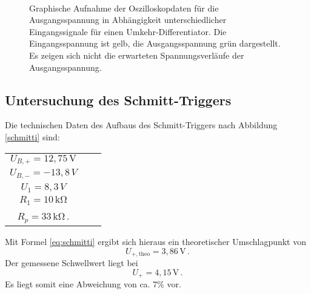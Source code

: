 \begin{figure}[!ht]
   \centering
   \quad
   \\
   \caption{Graphische Aufnahme der Oszilloskopdaten für die Ausgangsspannung in Abhängigkeit unterschiedlicher Eingangssignale für einen Umkehr-Differentiator. Die Eingangsspannung ist gelb, die Ausgangsspannung grün dargestellt. Es zeigen  sich nicht die erwarteten Spannungsverläufe der Ausgangsspannung.}
   \label{fig:diff}
\end{figure}
\clearpage

\subsection{Untersuchung des Schmitt-Triggers}
Die technischen Daten des Aufbaus des Schmitt-Triggers nach Abbildung \ref{schmitti} sind:
\begin{table}[H]
\centering
\begin{tabular}{ccc}
$U_{B,+}=12{,}75 \,\si{\V}$ \\
$U_{B,-}=-13{,}8\,\si{V}$ \\
$U_1=8{,}3\,\si{V}$ \\
$R_1=10\,\si{\kilo\ohm}$ \\
$R_p=33\,\si{\kilo\ohm}$\,. \\
\end{tabular}
\end{table}
Mit Formel \eqref{eq:schmitti} ergibt sich hieraus ein theoretischer Umschlagpunkt von
\begin{equation}
U_{+,\text{theo}}=3{,}86\,\si{\V}\,.
\end{equation}
Der gemessene Schwellwert liegt bei
\begin{equation}
U_{+}=4{,}15\,\si{\V}\,.
\end{equation}
Es liegt somit eine Abweichung von ca. $7\%$ vor.
\clearpage
